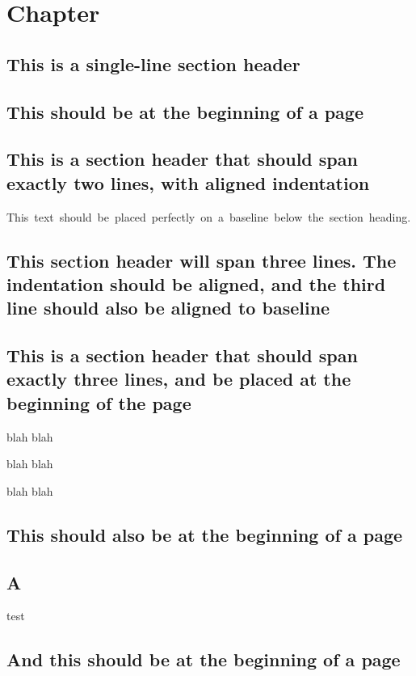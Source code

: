 \documentclass[baselinegrid,noprint,nocopyright]{uit-thesis-test}
\begin{document}
\mainmatter

\chapter{Chapter}
\lipsum[1]

\section{This is a single-line section header}
\lipsum[3-7]

\section{This should be at the beginning of a page}
\lipsum[8]

\section{This is a section header that should span exactly two lines, with aligned indentation}
\mbox{This~text~should~be~placed~perfectly~on~a~baseline~below~the~section~heading.}

\lipsum[9]

\section{This section header will span three lines. The indentation should be aligned, and the third line should also be aligned to baseline}
\lipsum[10-14]

\section{This is a section header that should span exactly three lines, and be placed at the beginning of the page}

\lipsum[15-17]

blah blah

blah blah

blah blah



\section{This should also be at the beginning of a page}
\section{A}
test

\newpage
\section{And this should be at the beginning of a page}
\end{document}
